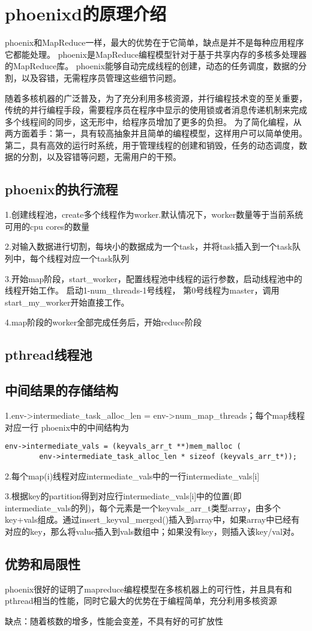 \section{phoenixd的原理介绍}
phoenix和MapReduce一样，最大的优势在于它简单，缺点是并不是每种应用程序它都能处理。
phoenix是MapReduce编程模型针对于基于共享内存的多核多处理器的MapReduce库。
phoenix能够自动完成线程的创建，动态的任务调度，数据的分割，以及容错，无需程序员管理这些细节问题。

随着多核机器的广泛普及，为了充分利用多核资源，并行编程技术变的至关重要，传统的并行编程手段，需要程序员在程序中显示的使用锁或者消息传递机制来完成多个线程间的同步，这无形中，给程序员增加了更多的负担。
为了简化编程，从两方面着手：第一，具有较高抽象并且简单的编程模型，这样用户可以简单使用。第二，具有高效的运行时系统，用于管理线程的创建和销毁，任务的动态调度，数据的分割，以及容错等问题，无需用户的干预。
\subsection{phoenix的执行流程}
1.创建线程池，create多个线程作为worker.默认情况下，worker数量等于当前系统可用的cpu cores的数量

2.对输入数据进行切割，每块小的数据成为一个task，并将task插入到一个task队列中，每个线程对应一个task队列

3.开始map阶段，start\_worker，配置线程池中线程的运行参数，启动线程池中的线程开始工作。
启动1-num\_threads-1号线程， 第0号线程为master，调用start\_my\_worker开始直接工作。

4.map阶段的worker全部完成任务后，开始reduce阶段

\subsection{pthread线程池}

\subsection{中间结果的存储结构}
1.env->intermediate\_task\_alloc\_len = env->num\_map\_threads；每个map线程对应一行
phoenix中的中间结构为
\begin{lstlisting}
env->intermediate_vals = (keyvals_arr_t **)mem_malloc (
        env->intermediate_task_alloc_len * sizeof (keyvals_arr_t*));
\end{lstlisting}

2.每个map(i)线程对应intermediate\_vals中的一行intermediate\_vals[i]

3.根据key的partition得到对应行intermediate\_vals[i]中的位置(即intermediate\_vals的列)，每个元素是一个keyvals\_arr\_t类型array，由多个key+vals组成。通过insert\_keyval\_merged()插入到array中，如果array中已经有对应的key，那么将value插入到vals数组中；如果没有key，则插入该key/val对。

\subsection{优势和局限性}
phoenix很好的证明了mapreduce编程模型在多核机器上的可行性，并且具有和pthread相当的性能，同时它最大的优势在于编程简单，充分利用多核资源

缺点：随着核数的增多，性能会变差，不具有好的可扩放性

